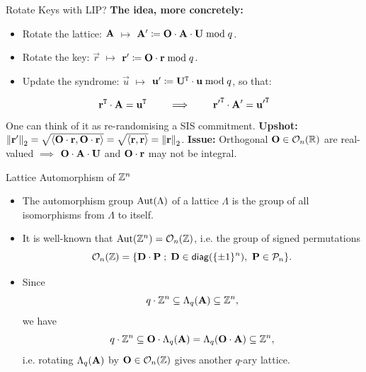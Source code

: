\documentclass[xcolor=table,10pt,aspectratio=169]{beamer}
\begin{document}
\begin{frame}{Rotate Keys with LIP?}
  \textbf{The idea, more concretely:}
  \begin{itemize}[label=\textbullet]
    \item Rotate the lattice: \(\mathbf{A}\) \(\mapsto\) \(\mathbf{A}' \coloneqq \mathbf{O} \cdot \mathbf{A} \cdot \mathbf{U} \bmod q\).
    \item Rotate the key: \(\vec{r}\) \(\mapsto\) \(\mathbf{r}' \coloneqq \mathbf{O} \cdot \mathbf{r} \bmod q\).
    \item Update the syndrome: \(\vec{u}\) \(\mapsto\) \(\mathbf{u}' \coloneqq \mathbf{U}^{\mathtt{T}} \cdot \mathbf{u} \bmod q\), so that:
  \end{itemize}
  \vfill
  \[
    \mathbf{r}^{\mathtt{T}} \cdot \mathbf{A} = \mathbf{u}^{\mathtt{T}}
    \qquad
    \implies
    \qquad
    \mathbf{r'}^{\mathtt{T}} \cdot \mathbf{A'} = \mathbf{u'}^{\mathtt{T}}
  \]
  \vfill
  One can think of it as re-randomising a SIS commitment.
  \vfill
  \pause
  \textbf{Upshot:}
  \(\left\lVert\mathbf{r'}\right\rVert_2 = \sqrt{\langle \mathbf{O}\cdot\mathbf{r}, \mathbf{O}\cdot\mathbf{r} \rangle} = \sqrt{\langle \mathbf{r}, \mathbf{r} \rangle} = \left\lVert\mathbf{r}\right\rVert_2\).
  \vfill
  \pause
  \textbf{Issue:}
  Orthogonal \(\mathbf{O} \in \mathcal{O}_n(\mathbb{R})\) are real-valued
  \(\implies\) \(\mathbf{O} \cdot \mathbf{A} \cdot \mathbf{U}\) and \(\mathbf{O} \cdot \mathbf{r}\) may not be integral.
\end{frame}

\begin{frame}{Lattice Automorphism of \(\mathbb{Z}^n\)}
  \begin{itemize}[label=\textbullet]
    \item The automorphism group \(\operatorname{Aut}(\Lambda)\) of a lattice \(\Lambda\) is the group of all isomorphisms from \(\Lambda\) to itself.
      \vfill
    \item It is well-known that \(\operatorname{Aut}(\mathbb{Z}^n) = \mathcal{O}_n(\mathbb{Z})\), i.e. the group of signed permutations
      \[
        \Ort_n(\ZZ) = \set{ \mat{D} \cdot \mat{P} \; ; \;  \mat{D} \in \mathsf{diag}(\{\pm 1\}^n),~\mat{P} \in \mathcal{P}_n }.
      \]
      \vfill
      \pause
    \item Since 
      \[
        q \cdot \mathbb{Z}^n \subseteq \Lambda_q(\mathbf{A}) \subseteq \mathbb{Z}^n,
      \] 
      we have 
      \[
        q \cdot \mathbb{Z}^n \subseteq \mathbf{O} \cdot \Lambda_q(\mathbf{A}) = \Lambda_q(\mathbf{O}\cdot\mathbf{A}) \subseteq \mathbb{Z}^n,
      \]
      i.e. rotating \(\Lambda_q(\mathbf{A})\) by \(\mathbf{O} \in \mathcal{O}_n(\mathbb{Z})\) gives another \(q\)-ary lattice.
  \end{itemize}
\end{frame}
\end{document}
